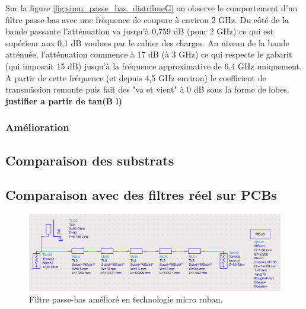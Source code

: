 \documentclass[french]{article}
\begin{document}
Sur la figure \ref{fig:simu_passe_bas_distribueG} on observe le comportement d'un filtre passe-bas avec une fréquence de coupure à environ 2 GHz. Du côté de la bande passante l'atténuation va jusqu'à 0,759 dB (pour 2 GHz) ce qui est supérieur aux 0,1 dB voulues par le cahier des charges. Au niveau de la bande atténuée, l'atténuation commence à 17 dB (à 3 GHz) ce qui respecte le gabarit (qui imposait 15 dB) jusqu'à la fréquence approximative de 6,4 GHz uniquement. A partir de cette fréquence (et depuis 4,5 GHz environ) le coefficient de transmission remonte puis fait des "va et vient" à 0 dB sous la forme de lobes. \\

\textbf{justifier a partir de tan(B l)}



\subsubsection{Amélioration}

\subsection{Comparaison des substrats}

\subsection{Comparaison avec des filtres réel sur PCBs}



\begin{figure}[H]
	\centering
	\includegraphics[width=15cm]{photo/passe_bas_vic/schema_distribue_ameliore_passe_bas_ads.png}
	\caption{Filtre passe-bas amélioré en technologie micro ruban.}
	\label{fig:schema_distribue_ameliore_passe_bas_ads}
\end{figure}
\end{document}
